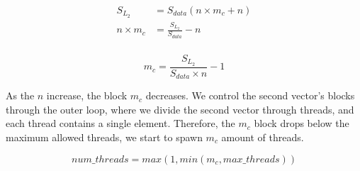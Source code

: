 \begin{align*}
    S_{L_2} &= S_{data}(n \times m_c + n)\\
    n \times m_c &= \frac{S_{L_2}}{S_{data}} - n\\
\end{align*}

\begin{equation}
    m_c = \frac{S_{L_2}}{S_{data} \times n} - 1
    \label{eq:outer_block}
\end{equation}

As the $n$ increase, the block $m_c$ decreases. 
We control the second vector's blocks through the outer loop, 
where we divide the second vector through threads, and each 
thread contains a single element. Therefore, 
the $m_c$ block drops below the maximum allowed threads, 
we start to spawn $m_c$ amount of threads.

\begin{equation}
    num\_threads = max(1, min(m_c,max\_threads)) 
    \label{eq:outer_num_threads}
\end{equation}


